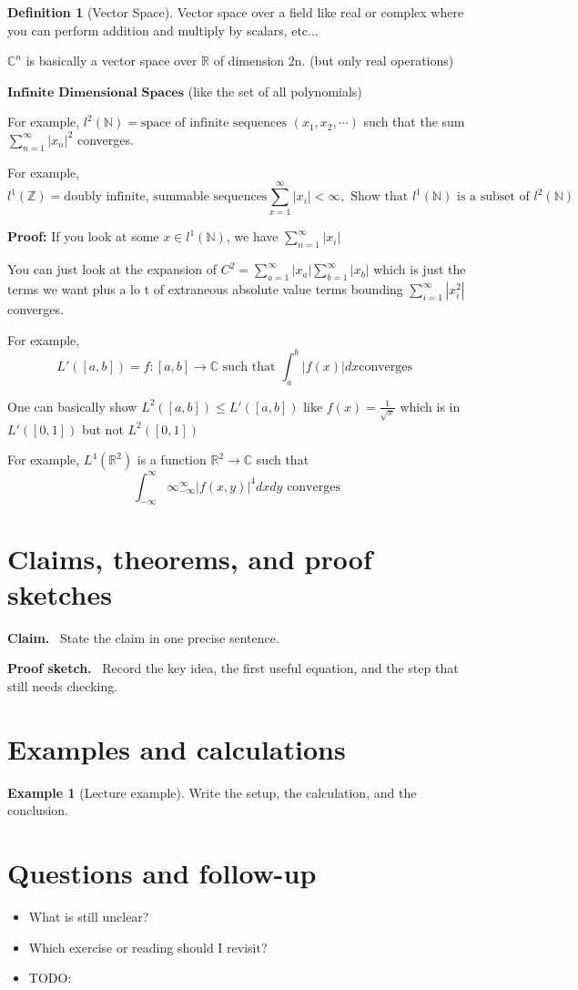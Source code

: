 \documentclass[11pt]{article}
\newcommand{\1}{\mathbf{1}}
\theoremstyle{notestyle}
\theoremstyle{definition}
\newtheorem{definition}[theorem]{Definition}
\newtheorem{example}[theorem]{Example}
\newenvironment{claim}{\par\noindent\textbf{Claim.}\ }{\par}
\newenvironment{proofsketch}{\par\noindent\textbf{Proof sketch.}\ }{\par}
\begin{document}
\begin{definition}[Vector Space]
\label{def:label}
Vector space over a field like real or complex where you can perform addition and
multiply by scalars, etc...
\par $\mathbb{C}^{n}$ is basically a vector space over $\mathbb{R}$ of dimension 2n. (but
only real operations)
\par $\textbf{Infinite Dimensional Spaces}$ (like the set of all polynomials)
\par For example, $l^2(\mathbb{N}) = \text{space of infinite sequences } (x_1, x_2, \cdots)$
such that the sum $\sum_{n=1}^{\infty}|x_n|^2$ converges.
\par For example, $$l^1(\mathbb{Z}) = \text{doubly infinite, summable sequences}
\sum_{x=1}^{\infty} |x_i| < \infty, \text{ Show that } l^1(\mathbb{N}) \text{ is a
subset of } l^2(\mathbb{N})$$
\par \textbf{Proof: }
If you look at some $x \in l^1(\mathbb{N})$, we have $\sum_{n=1}^{\infty} |x_i| $
\par You can just look at the expansion of $C^2 =
\sum_{a=1}^{\infty}|x_a|\sum_{b=1}^{\infty}|x_b|$ which is just the terms we want plus a lo t
of extraneous absolute value terms bounding $\sum_{i=1}^{\infty}|x_i^2|$
converges.
\par For example, $$L'([a, b]) = f : [a, b] \rightarrow \mathbb{C}\text{ such that } {\int_{a}^{b}|f(x)|dx
\text {converges }}$$ 
\par One can basically show $L^2([a, b]) \le L'([a, b])$ like $f(x) =
\frac{1}{\sqrt{x}}$ which is in $L'([0, 1])$ but not $L^2([0, 1])$
\par For example, $L^4(\mathbb{R}^2)$ is a function $\mathbb{R}^2 \rightarrow
\mathbb{C}$ such that $$\int_{-\infty}^{\infty}\infty_{-\infty}^{\infty}|f(x,y)|^4dx
dy \text { converges} $$ 
\end{definition}

\section{Claims, theorems, and proof sketches}
\begin{claim}
State the claim in one precise sentence.
\end{claim}

\begin{proofsketch}
Record the key idea, the first useful equation, and the step that still needs checking.
\end{proofsketch}

\section{Examples and calculations}
\begin{example}[Lecture example]
Write the setup, the calculation, and the conclusion.
\end{example}

\section{Questions and follow-up}
\begin{itemize}
  \item What is still unclear?
  \item Which exercise or reading should I revisit?
  \item TODO: 
\end{itemize}
\end{document}
